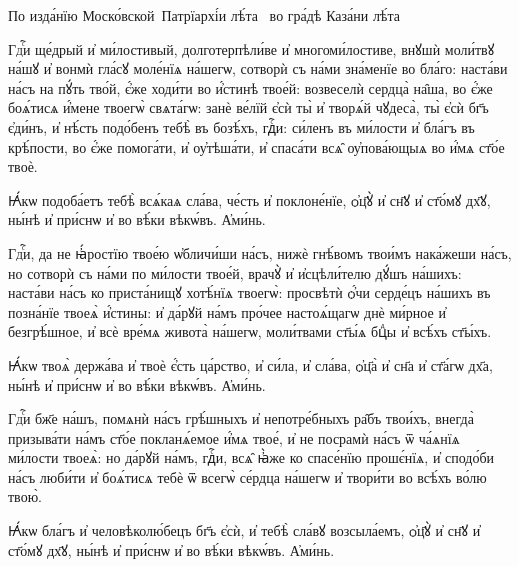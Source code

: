 \documentclass{article}          %
\makeatletter
\def\cu@lettrine{\lettrine[lines=2,nindent=0pt,loversize=-0.15]}
\def\cuLettrine{\cu@tokenizeletter\cu@lettrine}
\newcommand{\header}[1]{{\Huge\centering\cuKinovar{#1}\par}}
\makeatother
\begin{document}
\begin{titlepage}
  \centering
  \fontsize{2cm}{2cm}\selectfont
  {}
  \vfill
  \Large
  По изда́нїю Моско́вской~Патрїархі́и лѣ́та~ во гра́дѣ Каза́ни лѣ́та~
 \date{}
\end{titlepage}

\pagestyle{cuNum}
\Large             %

\header{На вече́рни}
\vspace{2em}
\vspace{1em}

\begin{center}
\end{center}
\cuLettrine
Гдⷭ҇и ще́дрый и҆ ми́лостивый, долготерпѣли́ве и҆ многоми́лостиве, внꙋшѝ моли́твꙋ на́шꙋ и҆ вонмѝ гла́сꙋ моле́нїѧ на́шегѡ,
сотворѝ съ на́ми зна́менїе во бла́го: наста́ви на́съ на пꙋ́ть тво́й, є҆́же ходи́ти во и҆́стинѣ твое́й: возвеселѝ сердца̀ на̑ша,
во є҆́же боѧ́тисѧ и҆́мене твоегѡ̀ свѧта́гѡ: занѐ ве́лїй є҆сѝ ты̀ и҆ творѧ́й чꙋдеса̀, ты̀ є҆сѝ бг҃ъ є҆ди́нъ, и҆ нѣ́сть подо́бенъ тебѣ̀ въ бозѣ́хъ,
гдⷭ҇и: си́ленъ въ ми́лости и҆ бла́гъ въ крѣ́пости, во є҆́же помога́ти, и҆ оу҆тѣша́ти, и҆ спаса́ти всѧ̑ оу҆пова́ющыѧ во и҆́мѧ ст҃о́е твоѐ.
\par
\cuKinovar Ꙗ҆́кѡ подоба́етъ тебѣ̀ всѧ́каѧ сла́ва, че́сть и҆ поклоне́нїе, ѻ҆ц҃ꙋ̀ и҆ сн҃ꙋ и҆ ст҃о́мꙋ дх҃ꙋ, ны́нѣ и҆ при́снѡ и҆ во вѣ́ки вѣкѡ́въ.
\cuKinovar А҆ми́нь.

\begin{center}
\end{center}
\cuLettrine
Гдⷭ҇и, да не ꙗ҆́ростїю твое́ю ѡ҆бличи́ши на́съ, нижѐ гнѣ́вомъ твои́мъ нака́жеши на́съ, но сотворѝ съ на́ми по ми́лости твое́й,
врачꙋ̀ и҆ и҆сцѣли́телю дꙋ́шъ на́шихъ: наста́ви на́съ ко приста́нищꙋ хотѣ́нїѧ твоегѡ̀: просвѣтѝ ѻ҆́чи серде́цъ на́шихъ
въ позна́нїе твоеѧ̀ и҆́стины: и҆ да́рꙋй на́мъ про́чее настоѧ́щагѡ днѐ ми́рное и҆ безгрѣ́шное, и҆ всѐ вре́мѧ живота̀ на́шегѡ,
моли́твами ст҃ы́ѧ бцⷣы и҆ всѣ́хъ ст҃ы́хъ.
\par
\cuKinovar Ꙗ҆́кѡ твоѧ̀ держа́ва и҆ твоѐ є҆́сть ца́рство, и҆ си́ла, и҆ сла́ва, ѻ҆ц҃а̀ и҆ сн҃а и҆ ст҃а́гѡ дх҃а, ны́нѣ и҆ при́снѡ и҆ во вѣ́ки вѣкѡ́въ.
\cuKinovar А҆ми́нь.

\begin{center}
\end{center}
\cuLettrine
Гдⷭ҇и бж҃е на́шъ, помѧнѝ на́съ грѣ́шныхъ и҆ непотре́бныхъ ра̑бъ твои́хъ, внегда̀ призыва́ти на́мъ ст҃о́е покланѧ́емое и҆́мѧ твое́, и҆ не посрамѝ на́съ ѿ ча́ѧнїѧ ми́лости твоеѧ̀: но да́рꙋй на́мъ, гдⷭ҇и, всѧ̑ ꙗ҆̀же ко спасе́нїю прошє́нїѧ, и҆ сподо́би на́съ люби́ти и҆ боѧ́тисѧ тебѐ ѿ всегѡ̀ се́рдца на́шегѡ и҆ твори́ти во всѣ́хъ во́лю твою̀.
\par
\cuKinovar Ꙗ҆́кѡ бла́гъ и҆ человѣколю́бецъ бг҃ъ є҆сѝ, и҆ тебѣ̀ сла́вꙋ возсыла́емъ, ѻ҆ц҃ꙋ̀ и҆ сн҃ꙋ и҆ ст҃о́мꙋ дх҃ꙋ, ны́нѣ и҆ при́снѡ и҆ во вѣ́ки вѣкѡ́въ.
\cuKinovar А҆ми́нь.
\end{document}
